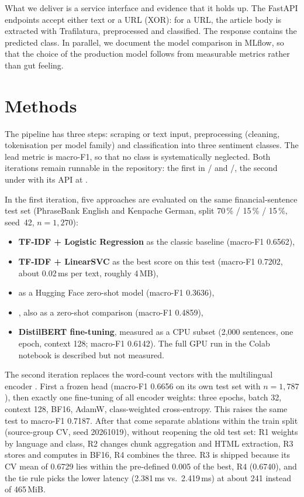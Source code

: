 \documentclass[12pt,toc=bib,toc=listof]{scrreprt}
\begin{document}
What we deliver is a service interface and evidence that it holds up. The FastAPI endpoints accept either text or a URL (XOR): for a URL, the article body is extracted with Trafilatura, preprocessed and classified. The response contains the predicted class. In parallel, we document the model comparison in MLflow, so that the choice of the production model follows from measurable metrics rather than gut feeling.

\section{Methods}

The pipeline has three steps: scraping or text input, preprocessing (cleaning, tokenisation per model family) and classification into three sentiment classes. The lead metric is macro-F1, so that no class is systematically neglected. Both iterations remain runnable in the repository: the first in / and /, the second under  with its API at .

In the first iteration, five approaches are evaluated on the same financial-sentence test set (PhraseBank English and Kenpache German, split 70\,\% / 15\,\% / 15\,\%, seed~42, $n=1{,}270$):

\begin{itemize}
  \item \textbf{TF-IDF + Logistic Regression} as the classic baseline (macro-F1 0.6562),
  \item \textbf{TF-IDF + LinearSVC} as the best score on this test (macro-F1 0.7202, about 0.02\,ms per text, roughly 4\,MB),
  \item \textbf{} as a Hugging Face zero-shot model (macro-F1 0.3636),
  \item \textbf{}, also as a zero-shot comparison (macro-F1 0.4859),
  \item \textbf{DistilBERT fine-tuning}, measured as a CPU subset (2{,}000 sentences, one epoch, context 128; macro-F1 0.6142). The full GPU run in the Colab notebook is described but not measured.
\end{itemize}

The second iteration replaces the word-count vectors with the multilingual encoder . First a frozen head (macro-F1 0.6656 on its own test set with $n=1{,}787$), then exactly one fine-tuning of all encoder weights: three epochs, batch 32, context 128, BF16, AdamW, class-weighted cross-entropy. This raises the same test to macro-F1 0.7187. After that come separate ablations within the train split (source-group CV, seed 20261019), without reopening the old test set: R1 weights by language and class, R2 changes chunk aggregation and HTML extraction, R3 stores and computes in BF16, R4 combines the three. R3 is shipped because its CV mean of 0.6729 lies within the pre-defined 0.005 of the best, R4 (0.6740), and the tie rule picks the lower latency (2.381\,ms vs.\ 2.419\,ms) at about 241 instead of 465\,MiB.
\end{document}

